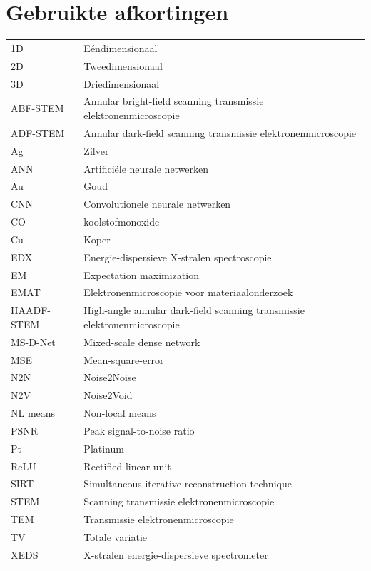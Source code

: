 \documentclass{report}
\begin{document}
\chapter*{Gebruikte afkortingen}
\begin{tabular}{ll}
1D	& Eéndimensionaal \\
2D	& Tweedimensionaal \\
3D	& Driedimensionaal \\
ABF-STEM	& Annular bright-field scanning transmissie elektronenmicroscopie \\
ADF-STEM	& Annular dark-field scanning transmissie elektronenmicroscopie \\
Ag	& Zilver \\
ANN	& Artificiële neurale netwerken \\
Au	& Goud \\
CNN	& Convolutionele neurale netwerken \\
CO	& koolstofmonoxide \\
Cu	& Koper \\
EDX	& Energie-dispersieve X-stralen spectroscopie \\
EM	& Expectation maximization \\
EMAT	& Elektronenmicroscopie voor materiaalonderzoek \\
HAADF-STEM	& High-angle annular dark-field scanning transmissie elektronenmicroscopie \\
MS-D-Net	& Mixed-scale dense network \\
MSE	& Mean-square-error \\
N2N	& Noise2Noise \\
N2V	& Noise2Void \\
NL means	& Non-local means \\
PSNR	& Peak signal-to-noise ratio \\
Pt	& Platinum \\
ReLU	& Rectified linear unit \\
SIRT	& Simultaneous iterative reconstruction technique  \\
STEM	& Scanning transmissie elektronenmicroscopie \\
TEM	& Transmissie elektronenmicroscopie \\
TV	& Totale variatie \\
XEDS	& X-stralen energie-dispersieve spectrometer
\end{tabular}



\end{document}
